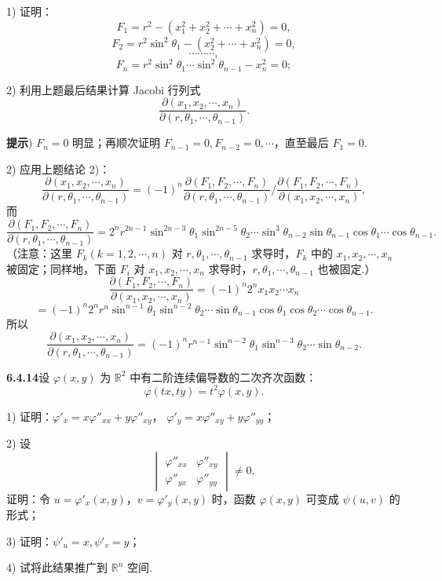 \documentclass[UTF8,12pt,a4paper,fontset=fandol]{ctexart}
\begin{document}
1) 证明：
\[
  F_1=r^2-(x_1^2+x_2^2+\cdots+x_n^2)=0,
\]
\[
  F_2=r^2\sin^2\theta_1-(x_2^2+\cdots+x_n^2)=0,
\]
\[
  \cdots\cdots\cdots,
\]
\[
  F_n=r^2\sin^2\theta_1\cdots\sin^2\theta_{n-1}-x_n^2=0;
\]

2) 利用上题最后结果计算 Jacobi 行列式
\[
  \frac{\partial(x_1,x_2,\cdots,x_n)}
       {\partial(r,\theta_1,\cdots,\theta_{n-1})}.
\]

\noindent\textbf{提示}) $F_n=0$ 明显；再顺次证明 $F_{n-1}=0,F_{n-2}=0,\cdots$，直至最后 $F_1=0$.

2) 应用上题结论 2)：
\[
  \frac{\partial(x_1,x_2,\cdots,x_n)}
       {\partial(r,\theta_1,\cdots,\theta_{n-1})}
  =
  (-1)^n
  \frac{\partial(F_1,F_2,\cdots,F_n)}
       {\partial(r,\theta_1,\cdots,\theta_{n-1})}
  \bigg/
  \frac{\partial(F_1,F_2,\cdots,F_n)}
       {\partial(x_1,x_2,\cdots,x_n)},
\]
而
\[
  \frac{\partial(F_1,F_2,\cdots,F_n)}
       {\partial(r,\theta_1,\cdots,\theta_{n-1})}
  =
  2^n r^{2n-1}\sin^{2n-3}\theta_1\sin^{2n-5}\theta_2
  \cdots\sin^3\theta_{n-2}\sin\theta_{n-1}
  \cos\theta_1\cdots\cos\theta_{n-1}.
\]
（注意：这里 $F_k(k=1,2,\cdots,n)$ 对 $r,\theta_1,\cdots,\theta_{n-1}$ 求导时，$F_k$ 中的 $x_1,x_2,\cdots,x_n$ 被固定；同样地，下面 $F_i$ 对 $x_1,x_2,\cdots,x_n$ 求导时，$r,\theta_1,\cdots,\theta_{n-1}$ 也被固定.）
\[
  \frac{\partial(F_1,F_2,\cdots,F_n)}
       {\partial(x_1,x_2,\cdots,x_n)}
  =
  (-1)^n2^n x_1x_2\cdots x_n
\]
\[
  =
  (-1)^n2^n r^n\sin^{n-1}\theta_1\sin^{n-2}\theta_2
  \cdots\sin\theta_{n-1}\cos\theta_1\cos\theta_2\cdots\cos\theta_{n-1}.
\]
所以
\[
  \frac{\partial(x_1,x_2,\cdots,x_n)}
       {\partial(r,\theta_1,\cdots,\theta_{n-1})}
  =
  (-1)^n r^{n-1}\sin^{n-2}\theta_1\sin^{n-3}\theta_2\cdots\sin\theta_{n-2}.
\]

\noindent\textbf{6.4.14}\quad 设 $\varphi(x,y)$ 为 $\mathbb R^2$ 中有二阶连续偏导数的二次齐次函数：
\[
  \varphi(tx,ty)=t^2\varphi(x,y).
\]

1) 证明：$\varphi'_x=x\varphi''_{xx}+y\varphi''_{xy}$，
$\varphi'_y=x\varphi''_{xy}+y\varphi''_{yy}$；

2) 设
\[
  \begin{vmatrix}
    \varphi''_{xx} & \varphi''_{xy}\\
    \varphi''_{yx} & \varphi''_{yy}
  \end{vmatrix}
  \ne0,
\]
证明：令 $u=\varphi'_x(x,y)$，$v=\varphi'_y(x,y)$ 时，函数 $\varphi(x,y)$ 可变成 $\psi(u,v)$ 的形式；

3) 证明：$\psi'_u=x,\psi'_v=y$；

4) 试将此结果推广到 $\mathbb R^n$ 空间.
\end{document}
